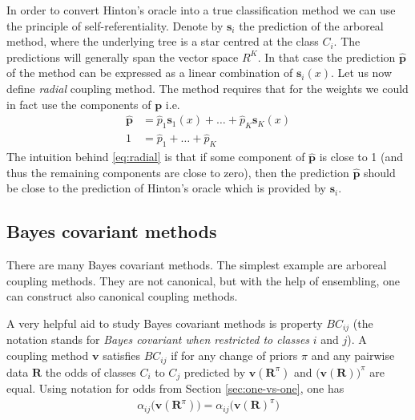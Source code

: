 In order to convert Hinton's oracle into a true classification method we can use the principle of self-referentiality.  Denote by $\boldsymbol{s}_i$ the prediction of the arboreal method, where the underlying tree is a star centred at the class $C_i$. The predictions will generally span the vector space $R^K$. In that case the prediction $\hat{\boldsymbol{p}}$ of the method  can be expressed as a linear combination of $\boldsymbol{s}_i(x)$. Let us now define \emph{radial} coupling method. The  method requires that for the  weights we could in fact use the components of $\boldsymbol{p}$ i.e.
\begin{equation}
	\begin{split}
	\hat {\boldsymbol{p}} &= \hat p_1 \boldsymbol{s}_1(x) + \ldots + \hat p_K \boldsymbol{s}_K(x)\\
	1 &= \hat p_1 + \ldots + \hat p_K
	\end{split}
	 \label{eq:radial}
\end{equation}
%
The intuition behind \eqref{eq:radial} is that if some component of $\hat{\boldsymbol{p}}$ is close to 1 (and thus the remaining components are close to zero), then the prediction $\hat{\boldsymbol{p}}$ should be close to the prediction of Hinton's oracle which is provided by ${\boldsymbol{s}}_i$.

\subsection{Bayes covariant methods} \label{sec:bc2}

There are many Bayes covariant methods. The simplest example are arboreal coupling methods. They are not canonical, but with the help of ensembling, one can construct also canonical coupling methods. 

A very helpful aid to study Bayes covariant methods is property $BC_{ij}$ (the notation stands for \emph{Bayes covariant when restricted to classes} $i$ and $j$). A coupling method $\boldsymbol{v}$ satisfies $BC_{ij}$ if for any change of priors $\pi$ and any  pairwise data $\boldsymbol{R}$ the odds of classes $C_i$ to $C_j$ predicted by $\boldsymbol{v}(\boldsymbol{R}^\pi)$ and $\bigl(\boldsymbol{v}(\boldsymbol{R})\bigr)^\pi$ are equal. Using  notation for odds from Section \ref{sec:one-vs-one}, one has
\begin{align}
	\alpha_{ij} \bigl(\boldsymbol{v}(\boldsymbol{R}^\pi) \bigr) = \alpha_{ij} \bigl(\boldsymbol{v}(\boldsymbol{R})^\pi \bigr)
\end{align}

